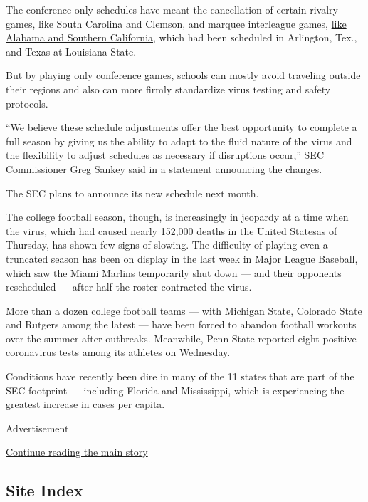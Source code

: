 The conference-only schedules have meant the cancellation of certain
rivalry games, like South Carolina and Clemson, and marquee interleague
games,
\href{https://www.nytimes.com/2020/05/17/sports/ncaafootball/college-football-no-fans.html}{like
Alabama and Southern California}, which had been scheduled in Arlington,
Tex., and Texas at Louisiana State.

But by playing only conference games, schools can mostly avoid traveling
outside their regions and also can more firmly standardize virus testing
and safety protocols.

``We believe these schedule adjustments offer the best opportunity to
complete a full season by giving us the ability to adapt to the fluid
nature of the virus and the flexibility to adjust schedules as necessary
if disruptions occur,'' SEC Commissioner Greg Sankey said in a statement
announcing the changes.

The SEC plans to announce its new schedule next month.

The college football season, though, is increasingly in jeopardy at a
time when the virus, which had caused
\href{https://www.nytimes.com/interactive/2020/us/coronavirus-us-cases.html}{nearly
152,000 deaths in the United States}as of Thursday, has shown few signs
of slowing. The difficulty of playing even a truncated season has been
on display in the last week in Major League Baseball, which saw the
Miami Marlins temporarily shut down --- and their opponents rescheduled
--- after half the roster contracted the virus.

More than a dozen college football teams --- with Michigan State,
Colorado State and Rutgers among the latest --- have been forced to
abandon football workouts over the summer after outbreaks. Meanwhile,
Penn State reported eight positive coronavirus tests among its athletes
on Wednesday.

Conditions have recently been dire in many of the 11 states that are
part of the SEC footprint --- including Florida and Mississippi, which
is experiencing the
\href{https://www.nytimes.com/interactive/2020/us/coronavirus-us-cases.html}{greatest
increase in cases per capita.}

Advertisement

\protect\hyperlink{after-bottom}{Continue reading the main story}

\hypertarget{site-index}{%
\subsection{Site Index}\label{site-index}}

